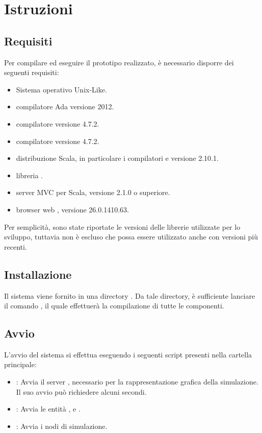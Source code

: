 \appendix
\chapter{Istruzioni}
	
	\section{Requisiti}
	
	Per compilare ed eseguire il prototipo realizzato, è necessario disporre dei seguenti requisiti:
	
	\begin{itemize}
		\item Sistema operativo Unix-Like.
		\item compilatore Ada  versione 2012.
		\item compilatore  versione 4.7.2.
		\item compilatore  versione 4.7.2.
		\item distribuzione Scala, in particolare i compilatori  e  versione 2.10.1.
		\item libreria .
		\item server MVC  per Scala, versione 2.1.0 o superiore.
		\item browser web , versione 26.0.1410.63.
	\end{itemize}
	
	Per semplicità, sono state riportate le versioni delle librerie utilizzate per lo sviluppo, tuttavia non è escluso che possa essere utilizzato anche con versioni più recenti.
	
	\section{Installazione}
	
	Il sistema viene fornito in una directory . Da tale directory, è sufficiente lanciare il comando , il quale effettuerà la compilazione di tutte le componenti.
	
	\section{Avvio}
	
	L'avvio del sistema si effettua eseguendo i seguenti script presenti nella cartella principale:
	
		\begin{itemize}
			\item {} : Avvia il server , necessario per la rappresentazione grafica della simulazione. Il suo avvio può richiedere alcuni secondi.
			\item {} : Avvia le entità ,  e .
			\item {} : Avvia i nodi di simulazione.
		\end{itemize}
		
